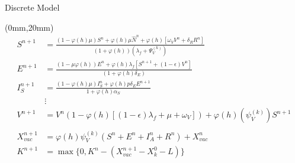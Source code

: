 \begin{frame}{Discrete Model}
    \begin{textblock*}{120mm}(0mm,20mm)
     \begin{align*}
        S^{n+1} &=
            \frac{
                (1-\varphi(h) \mu) S^n
                + \varphi(h)\mu \widehat{N}^n
                + \varphi(h)[
                    \omega_V V^n
                    + \delta_R R^n
                ]}{
                        (1 + \varphi(h))
                        (\lambda_f + \Psi_V^{(k)})
            }
         \\
         E^{n+1}
             &=
             \frac{
                 (1- \mu \varphi(h)) E^n
                 + \varphi(h) \lambda_f
                 [
                     S^{n+1} + (1- \epsilon) V^n
                 ]
             }{
                 (1 + \varphi(h)
                 \delta_E)
             }
         \\
     I_S^{n+1}
     &=
         \frac{
             (1 -\varphi(h) \mu) I_S^n
             + \varphi(h) p \delta_E E^{n+1}
         }{
             1 + \varphi(h) \alpha_S
         }
      \\
      &\vdots
      \\
      V^{n+1} &= V^n(1-\varphi(h)[(1 - \epsilon )\lambda_f + \mu + \omega _V]) +
           \varphi(h)(\psi_V^{(k)}) S^{n+1}
      \\
      \\
      X_{vac}^{n+1} &=
               \varphi(h) \psi_V^{(k)}
               (S^n + E^n + I_A^n + R^n)
               + X_{vac}^n
      \\
            K^{n+1} &=
                \max \{0, K^n - (X_{vac}^{n+1} - X_k^0 -L)\}
     \end{align*}
    \end{textblock*}
\end{frame}

